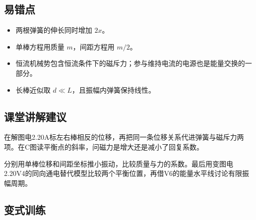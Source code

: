 \documentclass[UTF8,fontset=fandol,a4paper,11pt]{ctexart}
\begin{document}
\subsection*{易错点}

\begin{itemize}
\item 两根弹簧的伸长同时增加 $2x$。
\item 单棒方程用质量 $m$，间距方程用 $m/2$。
\item 恒流机械势包含恒流条件下的磁斥力；参与维持电流的电源也是能量交换的一部分。
\item 长棒近似取 $d\ll L$，且振幅内弹簧保持线性。
\end{itemize}



\subsection*{课堂讲解建议}

在解图电2.20A标左右棒相反的位移，再把同一条位移关系代进弹簧与磁斥力两项。在C图读平衡点的斜率，问磁力是增大还是减小了回复系数。

分别用单棒位移和间距坐标推小振动，比较质量与力的系数。最后用变图电2.20V4的同向通电替代模型比较两个平衡位置，再借V6的能量水平线讨论有限振幅周期。


\subsection*{变式训练}
\end{document}
